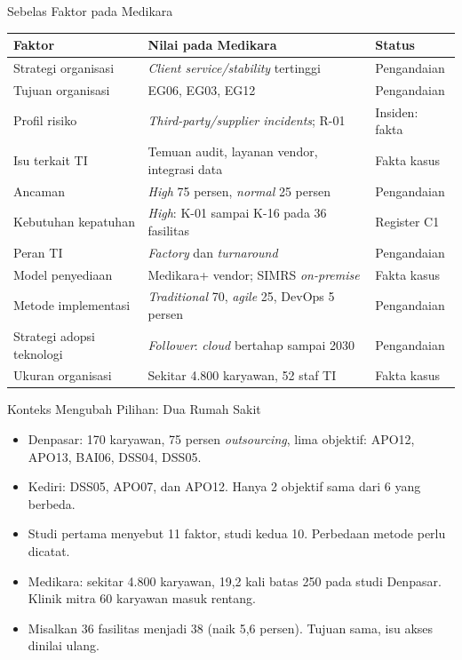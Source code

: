 \documentclass[aspectratio=169, table, 12pt]{beamer}
\begin{document}
\begin{frame}{{\Large Sebelas Faktor pada Medikara}}
  \vspace{0pt}
  \footnotesize
  \begin{tabularx}{\textwidth}{|>{\raggedright\arraybackslash}p{}|>{\raggedright\arraybackslash}X|>{\raggedright\arraybackslash}p{}|}
    \hline
    \textbf{Faktor} & \textbf{Nilai pada Medikara} & \textbf{Status} \\ \hline
    Strategi organisasi & \textit{Client service/stability} tertinggi & Pengandaian \\ \hline
    Tujuan organisasi & EG06, EG03, EG12 & Pengandaian \\ \hline
    Profil risiko & \textit{Third-party/supplier incidents}; R-01 & Insiden: fakta \\ \hline
    Isu terkait TI & Temuan audit, layanan vendor, integrasi data & Fakta kasus \\ \hline
    Ancaman & \textit{High} 75 persen, \textit{normal} 25 persen & Pengandaian \\ \hline
    Kebutuhan kepatuhan & \textit{High}: K-01 sampai K-16 pada 36 fasilitas & Register C1 \\ \hline
    Peran TI & \textit{Factory} dan \textit{turnaround} & Pengandaian \\ \hline
    Model penyediaan & Medikara+ vendor; SIMRS \textit{on-premise} & Fakta kasus \\ \hline
    Metode implementasi & \textit{Traditional} 70, \textit{agile} 25, DevOps 5 persen & Pengandaian \\ \hline
    Strategi adopsi teknologi & \textit{Follower}: \textit{cloud} bertahap sampai 2030 & Pengandaian \\ \hline
    Ukuran organisasi & Sekitar 4.800 karyawan, 52 staf TI & Fakta kasus \\ \hline
  \end{tabularx}
\end{frame}

\begin{frame}{{\Large Konteks Mengubah Pilihan: Dua Rumah Sakit}}
  \vspace{4pt}
  \small
  \begin{itemize}
    \item Denpasar: 170 karyawan, 75 persen \textit{outsourcing}, lima objektif: APO12, APO13, BAI06, DSS04, DSS05.
    \item Kediri: DSS05, APO07, dan APO12. Hanya 2 objektif sama dari 6 yang berbeda.
    \item Studi pertama menyebut 11 faktor, studi kedua 10. Perbedaan metode perlu dicatat.
    \item Medikara: sekitar 4.800 karyawan, 19,2 kali batas 250 pada studi Denpasar. Klinik mitra 60 karyawan masuk rentang.
    \item Misalkan 36 fasilitas menjadi 38 (naik 5,6 persen). Tujuan sama, isu akses dinilai ulang.
  \end{itemize}
\end{frame}
\end{document}
